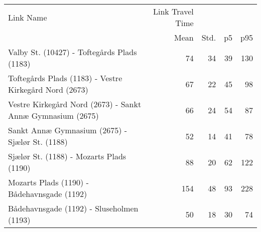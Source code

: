 \begin{tabular}{lrrrr}
\toprule
                                                  Link Name & Link Travel Time &      &    &     \\
                                                            &             Mean & Std. & p5 & p95 \\
\midrule
 Valby St. (10427) - Toftegårds Plads (1183) & 74 & 34 & 39 & 130 \\
 Toftegårds Plads (1183) - Vestre Kirkegård Nord (2673) & 67 & 22 & 45 & 98 \\
 Vestre Kirkegård Nord (2673) - Sankt Annæ Gymnasium (2675) & 66 & 24 & 54 & 87 \\
 Sankt Annæ Gymnasium (2675) - Sjælør St. (1188) & 52 & 14 & 41 & 78 \\
 Sjælør St. (1188) - Mozarts Plads (1190) & 88 & 20 & 62 & 122 \\
 Mozarts Plads (1190) - Bådehavnsgade (1192) & 154 & 48 & 93 & 228 \\
 Bådehavnsgade (1192) - Sluseholmen (1193) & 50 & 18 & 30 & 74 \\
\bottomrule
\end{tabular}
